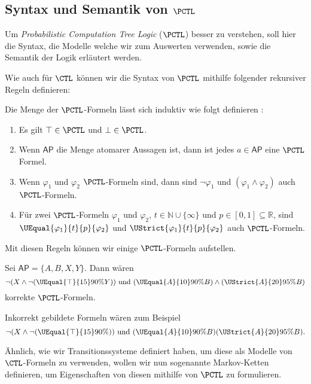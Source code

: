 \subsection{Syntax und Semantik von $\PCTL$}

Um \textit{Probabilistic Computation Tree Logic} ($\PCTL$) besser zu verstehen, soll hier die Syntax, die Modelle welche wir zum Auswerten verwenden, sowie die Semantik der Logik erläutert werden.

Wie auch für $\CTL$ können wir die Syntax von  $\PCTL$ mithilfe folgender rekursiver Regeln definieren:
\begin{definition}
	\label{SyntaxPCTL}
	Die Menge der $\PCTL$-Formeln lässt sich induktiv wie folgt definieren \cite{hansson1994logic}:
	\begin{enumerate}
		\item Es gilt $\top\in \PCTL$ und $\bot\in \PCTL$.
		\item Wenn $\mathsf{AP}$ die Menge atomarer Aussagen ist, dann ist jedes $a\in \mathsf{AP}$ eine $\PCTL$ Formel.
		\item Wenn $\varphi_1$ und $\varphi_2$ $\PCTL$-Formeln sind, dann sind $\neg\varphi_1$ und $(\varphi_1\land \varphi_2)$ auch $\PCTL$-Formeln.
		\item Für zwei $\PCTL$-Formeln $\varphi_1$ und $\varphi_2$, $t\in \mathbb{N}\cup\{\infty\}$ und $p\in [0,1]\subseteq\mathbb{R}$, sind $\UEqual{\varphi_1}{t}{p}{\varphi_2}$ und $\UStrict{\varphi_1}{t}{p}{\varphi_2}$ auch $\PCTL$-Formeln.
	\end{enumerate}
\end{definition}
Mit diesen Regeln können wir einige $\PCTL$-Formeln aufstellen.
\begin{example}
	\label{ExampleSyntax}
	Sei $\mathsf{AP}=\{A,B,X,Y\}$. Dann wären 
	$$\neg(X \land \neg(\UEqual{\top}{15}{90\%}{Y})) \text{ und } (\UEqual{A}{10}{90\%}{B}) \land (\UStrict{A}{20}{95\%}{B})$$ 
	korrekte $\PCTL$-Formeln.
	
	Inkorrekt gebildete Formeln wären zum Beispiel $$\neg(X \land \neg(\UEqual{\top}{15}{90\%}{})) \text{ und } (\UEqual{A}{10}{90\%}{B})(\UStrict{A}{20}{95\%}{B}).$$
\end{example}

Ähnlich, wie wir Transitionssysteme definiert haben, um diese als Modelle von $\CTL$-Formeln zu verwenden, wollen wir nun sogenannte Markov-Ketten definieren, um Eigenschaften von diesen mithilfe von $\PCTL$ zu formulieren.

